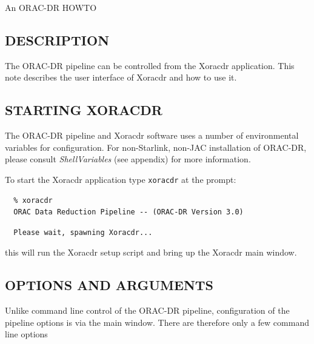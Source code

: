 \documentclass[twoside,11pt]{article}
\renewcommand{\_}{\texttt{\symbol{95}}}
\begin{document}
An ORAC-DR HOWTO

\subsection*{DESCRIPTION\label{Xoracdr_DESCRIPTION}}


The ORAC-DR pipeline can be controlled from the Xoracdr
application. This note describes the user interface of Xoracdr and how
to use it.

\subsection*{STARTING XORACDR\label{Xoracdr_STARTING_XORACDR}}


The ORAC-DR pipeline and Xoracdr software uses a number of
environmental variables for configuration. For non-Starlink, non-JAC
installation of ORAC-DR, please consult \emph{ShellVariables} (see
appendix) for more information.



To start the Xoracdr application type \texttt{xoracdr} at the prompt:

\begin{verbatim}
  % xoracdr
  ORAC Data Reduction Pipeline -- (ORAC-DR Version 3.0)
\end{verbatim}
\begin{verbatim}
  Please wait, spawning Xoracdr...
\end{verbatim}


this will run the Xoracdr setup script and bring up the Xoracdr main window.

\subsection*{OPTIONS AND ARGUMENTS\label{Xoracdr_OPTIONS_AND_ARGUMENTS}}


Unlike command line control of the ORAC-DR pipeline, configuration of
the pipeline options is via the main window. There are therefore only
a few command line options
\end{document}
